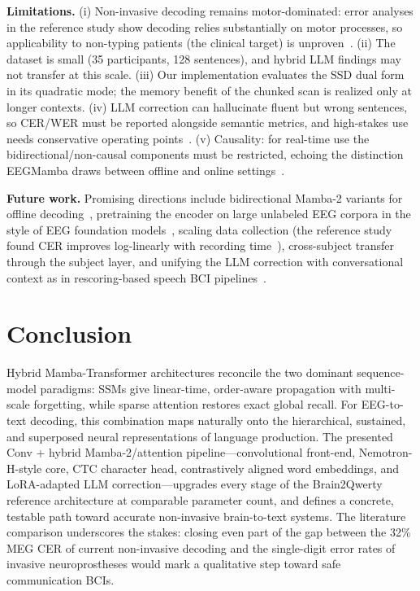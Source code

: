 \documentclass[conference]{IEEEtran}
\begin{document}
\textbf{Limitations.} (i) Non-invasive decoding remains motor-dominated:
error analyses in the reference study show decoding relies substantially on
motor processes, so applicability to non-typing patients (the clinical
target) is unproven~\cite{levy2025}. (ii) The dataset is small (35
participants, 128 sentences), and hybrid LLM findings may not transfer at
this scale. (iii) Our implementation evaluates the SSD dual form in its
quadratic mode; the memory benefit of the chunked scan is realized only at
longer contexts. (iv) LLM correction can hallucinate fluent but wrong
sentences, so CER/WER must be reported alongside semantic metrics, and
high-stakes use needs conservative operating points~\cite{caria2025}.
(v) Causality: for real-time use the bidirectional/non-causal components
must be restricted, echoing the distinction EEGMamba draws between offline
and online settings~\cite{gui2024eegmamba}.

\textbf{Future work.} Promising directions include bidirectional Mamba-2
variants for offline decoding~\cite{gui2024eegmamba}, pretraining the
encoder on large unlabeled EEG corpora in the style of EEG foundation
models~\cite{wang2025eegmamba}, scaling data collection (the reference study
found CER improves log-linearly with recording time~\cite{levy2025}),
cross-subject transfer through the subject layer, and unifying the LLM
correction with conversational context as in rescoring-based speech BCI
pipelines~\cite{willett2023}.

\section{Conclusion}
Hybrid Mamba-Transformer architectures reconcile the two dominant
sequence-model paradigms: SSMs give linear-time, order-aware propagation
with multi-scale forgetting, while sparse attention restores exact global
recall. For EEG-to-text decoding, this combination maps naturally onto the
hierarchical, sustained, and superposed neural representations of language
production. The presented Conv + hybrid Mamba-2/attention
pipeline---convolutional front-end, Nemotron-H-style core, CTC character
head, contrastively aligned word embeddings, and LoRA-adapted LLM
correction---upgrades every stage of the Brain2Qwerty reference architecture
at comparable parameter count, and defines a concrete, testable path toward
accurate non-invasive brain-to-text systems. The literature comparison
underscores the stakes: closing even part of the gap between the 32\% MEG
CER of current non-invasive decoding and the single-digit error rates of
invasive neuroprostheses would mark a qualitative step toward safe
communication BCIs.
\end{document}
